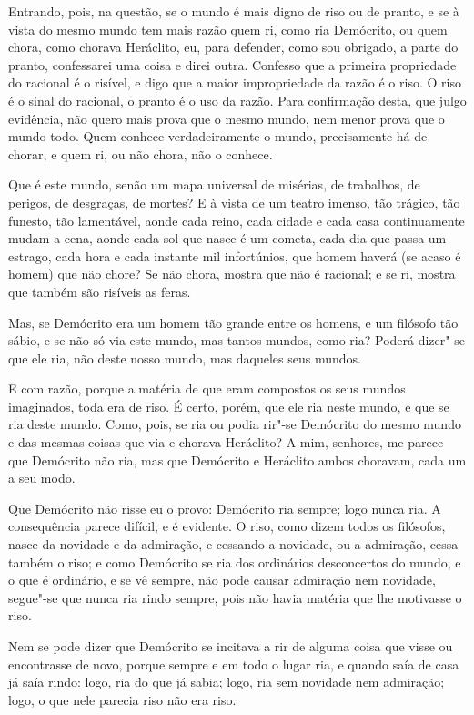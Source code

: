 Entrando, pois, na questão, se o mundo é mais digno de riso ou de
pranto, e se à vista do mesmo mundo tem mais razão quem ri, como ria
Demócrito, ou quem chora, como chorava Heráclito, eu, para defender,
como sou obrigado, a parte do pranto, confessarei uma coisa e direi
outra. Confesso que a primeira propriedade do racional é o risível, e
digo que a maior impropriedade da razão é o riso. O riso é o sinal do
racional, o pranto é o uso da razão. Para confirmação desta, que julgo
evidência, não quero mais prova que o mesmo mundo, nem menor prova que o
mundo todo. Quem conhece verdadeiramente o mundo, precisamente há de
chorar, e quem ri, ou não chora, não o conhece.

Que é este mundo, senão um mapa universal de misérias, de trabalhos, de
perigos, de desgraças, de mortes? E à vista de um teatro imenso, tão
trágico, tão funesto, tão lamentável, aonde cada reino, cada cidade e
cada casa continuamente mudam a cena, aonde cada sol que nasce é um
cometa, cada dia que passa um estrago, cada hora e cada instante mil
infortúnios, que homem haverá (se acaso é homem) que não chore? Se não
chora, mostra que não é racional; e se ri, mostra que também são
risíveis as feras.

Mas, se Demócrito era um homem tão grande entre os homens, e um filósofo
tão sábio, e se não só via este mundo, mas tantos mundos, como ria?
Poderá dizer"-se que ele ria, não deste nosso mundo, mas daqueles seus
mundos.

E com razão, porque a matéria de que eram compostos os seus mundos
imaginados, toda era de riso. É certo, porém, que ele ria neste mundo, e
que se ria deste mundo. Como, pois, se ria ou podia rir"-se Demócrito do
mesmo mundo e das mesmas coisas que via e chorava Heráclito? A mim,
senhores, me parece que Demócrito não ria, mas que Demócrito e Heráclito
ambos choravam, cada um a seu modo.

Que Demócrito não risse eu o provo: Demócrito ria sempre; logo nunca
ria. A consequência parece difícil, e é evidente. O riso, como dizem
todos os filósofos, nasce da novidade e da admiração, e cessando a
novidade, ou a admiração, cessa também o riso; e como Demócrito se ria
dos ordinários desconcertos do mundo, e o que é ordinário, e se vê
sempre, não pode causar admiração nem novidade, segue"-se que nunca ria
rindo sempre, pois não havia matéria que lhe motivasse o riso.

Nem se pode dizer que Demócrito se incitava a rir de alguma coisa que
visse ou encontrasse de novo, porque sempre e em todo o lugar ria, e
quando saía de casa já saía rindo: logo, ria do que já sabia; logo, ria
sem novidade nem admiração; logo, o que nele parecia riso não era riso.

